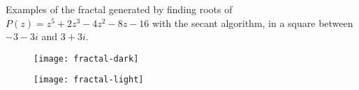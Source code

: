 \documentclass[a4paper]{article}
\begin{document}
\setlength{\parindent}{0em}
\setlength{\parskip}{1em}

Examples of the fractal generated by finding roots of $P(z) = z^5 + 2z^3 - 4z^2 - 8z - 16$ with the secant algorithm, in a square between $-3-3i$ and $3+3i$.

\begin{figure}[h]
	\centering
	\texttt{[image: fractal-dark]}
\end{figure}

\begin{figure}[h]
	\centering
	\texttt{[image: fractal-light]}
\end{figure}
\end{document}
